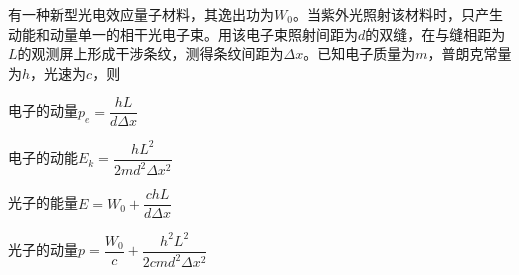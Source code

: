 有一种新型光电效应量子材料，其逸出功为\(W_0\)。当紫外光照射该材料时，只产生动能和动量单一的相干光电子束。用该电子束照射间距为\(d\)的双缝，在与缝相距为\(L\)的观测屏上形成干涉条纹，测得条纹间距为\(\Delta x\)。已知电子质量为\(m\)，普朗克常量为\(h\)，光速为\(c\)，则\paren[]
\begin{choices}
	\item 电子的动量\(p_e = \dfrac{hL}{d\Delta x}\)
	\item 电子的动能\(E_k = \dfrac{hL^2}{2md^2\Delta x^2}\)
	\item 光子的能量\(E = W_0 + \dfrac{chL}{d\Delta x}\)
	\item 光子的动量\(p = \dfrac{W_0}{c} + \dfrac{h^2L^2}{2cmd^2\Delta x^2}\)
\end{choices}	
\begin{answer}
    
\end{answer}